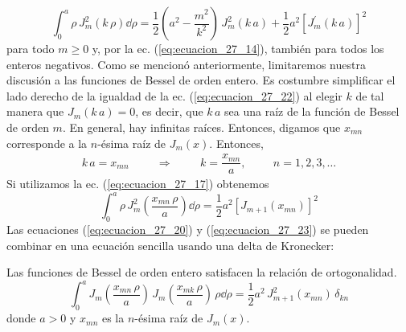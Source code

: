 \begin{equation}
\int_{0}^{a} \rho \, J_{m}^{2} ( k \, \rho) \dd{\rho} = \dfrac{1}{2} \left( a^{2} - \dfrac{m^{2}}{k^{2}} \right) \, J_{m}^{2} (k \, a) + \dfrac{1}{2} a^{2} [J_{m}^{\prime} (k \, a)]^{2}
\label{eq:ecuacion_27_22}
\end{equation}
para todo $m \geq 0$ y, por la ec. (\ref{eq:ecuacion_27_14}), también para todos los enteros negativos. Como se mencionó anteriormente, limitaremos nuestra discusión a las funciones de Bessel de orden entero. Es costumbre simplificar el lado derecho de la igualdad de la ec. (\ref{eq:ecuacion_27_22}) al elegir $k$ de tal manera que $J_{m} (k \, a) = 0$, es decir, que $k \, a$ sea una raíz de la función de Bessel de orden $m$. En general, hay infinitas raíces. Entonces, digamos que $x_{mn}$ corresponde a la $n$-ésima raíz de $J_m (x)$. Entonces,
\begin{align*}
k \, a = x_{mn} \hspace{1cm} \Longrightarrow \hspace{1cm} k = \dfrac{x_{mn}}{a}, \hspace{1cm} n = 1, 2, 3, \ldots
\end{align*}
Si utilizamos la ec. (\ref{eq:ecuacion_27_17}) obtenemos
\begin{equation}
\int_{0}^{a} \rho \, J_{m}^{2} \left(\dfrac{x_{mn} \, \rho}{a}   \right) \dd{\rho} = \dfrac{1}{2} a^{2} [J_{m+1} (x_{mn})]^{2}
\label{eq:ecuacion_27_23}
\end{equation}
Las ecuaciones (\ref{eq:ecuacion_27_20}) y (\ref{eq:ecuacion_27_23}) se pueden combinar en una ecuación sencilla usando una delta de Kronecker:
\begin{tcolorbox}
Las funciones de Bessel de orden entero satisfacen la relación de ortogonalidad.
\begin{equation}
\int_{0}^{a} J_{m} \left(\dfrac{x_{mn} \, \rho}{a} \right) \, J_{m} \left(\dfrac{x_{mk} \, \rho}{a} \right) \, \rho \dd{\rho} = \dfrac{1}{2} a^{2} \, J_{m+1}^{2} (x_{mn}) \, \delta_{kn}
\label{eq:ecuacion_27_24}
\end{equation}
donde $a > 0$ y $x_{mn}$ es la $n$-ésima raíz de $J_{m}(x)$.
\end{tcolorbox}
